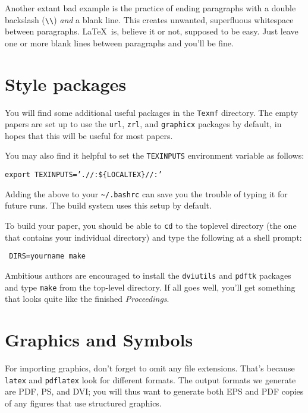 \documentclass[final]{ols}
\begin{document}
Another extant bad example is the practice of ending paragraphs with a
double backslash (\texttt{\textbackslash\textbackslash}) \textit{and}
a blank line.  This creates unwanted, superfluous whitespace between
paragraphs.  \LaTeX\ is, believe it or not, supposed to be easy.  Just
leave one or more blank lines between paragraphs and you'll be fine.


\section{Style packages}

You
will find some additional useful packages in the \texttt{Texmf}
directory.  The empty papers are set up to use the
\texttt{url}, \texttt{zrl}, and \texttt{graphicx} packages by default,
in hopes that this will be useful for most papers.

You may also find it helpful to set the \texttt{TEXINPUTS} environment
variable as follows:
\begin{center}
{\footnotesize \texttt{export TEXINPUTS='.//:\$\{LOCALTEX\}//:'}}
\end{center}
%
%
Adding the above to your \texttt{\textasciitilde/.bashrc} can
save you the trouble of typing it for future runs.  The build system
uses this setup by default.

To build your paper, you should be able to \texttt{cd} to the toplevel
directory (the one that contains your individual directory) 
and type the following at a shell prompt:

\begin{small}
\begin{verbatim}
 DIRS=yourname make
\end{verbatim}
\end{small}

Ambitious authors are encouraged to install the \texttt{dviutils}
and \texttt{pdftk} packages and type \texttt{make} from the top-level directory.
If all goes well, you'll get something that looks quite like the finished \textit{Proceedings}.

\section{Graphics and Symbols}

For importing graphics, don't forget to omit any file extensions.
That's because \texttt{latex} and \texttt{pdflatex} look for
different formats.  The output formats we generate are PDF, PS, and
DVI; you will thus want to generate both EPS and PDF copies of any
figures that use structured graphics.
\end{document}
